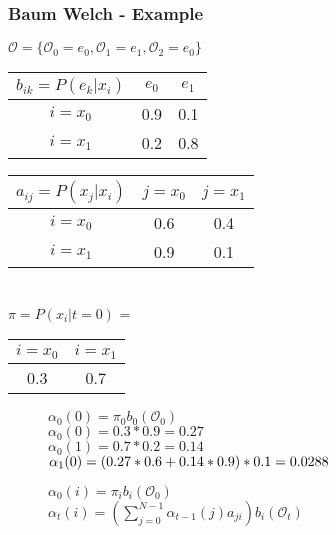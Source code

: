 \begin{frame}
	\frametitle{Baum Welch - Example}
  \begin{table}
  \centering
  $\mathcal{O} = \{\mathcal{O}_0 = e_0, \mathcal{O}_1 = e_1, \mathcal{O}_2 = e_0\}$\\
  \begin{tabular}{| c | c | c |}
  	\hline
    $b_{ik} = P(e_k|x_i)$ & $e_0$ & $e_1$ \\ \hline
    $i = x_0$                 & 0.9   & 0.1   \\ \hline
    $i = x_1$                 & 0.2   & 0.8   \\ \hline
  \end{tabular}
  \begin{tabular}{| c | c | c |}
  	\hline
    $a_{ij} = P(x_j|x_i)$ & $j = x_0$ & $j = x_1$ \\ \hline
    $i = x_0$                 & 0.6   & 0.4   \\ \hline
    $i = x_1$                 & 0.9   & 0.1   \\ \hline
  \end{tabular}
  \\$\pi = P(x_i|t=0)$ =
  \begin{tabular}{| c | c |}
  	\hline
    $i = x_0$ & $i = x_1$ \\ \hline
    0.3   & 0.7   \\ \hline
  \end{tabular}
  \begin{subfigure}{4.3cm}
  \begin{framed}
  $\alpha_0(0)=\pi_0 b_0(\mathcal{O}_0)$\\
  $\alpha_0(0)=0.3*0.9=0.27$\\
  $\alpha_0(1)=0.7*0.2=0.14$\\
  $\alpha_1(0)=\\(0.27*0.6+0.14*0.9)*0.1=0.0288$
  \end{framed}
  \end{subfigure}
  \begin{subfigure}{5.4cm}
  \centering
  \begin{framed}
  $\alpha_0(i) = \pi_i b_i(\mathcal{O}_0)$\\
  $\alpha_t(i) = \left(\sum\limits_{j=0}^{N-1} \alpha_{t-1}(j)a_{ji}\right)b_i(\mathcal{O}_t)$
  \end{framed}  
  \end{subfigure}
\end{table}
\end{frame}

